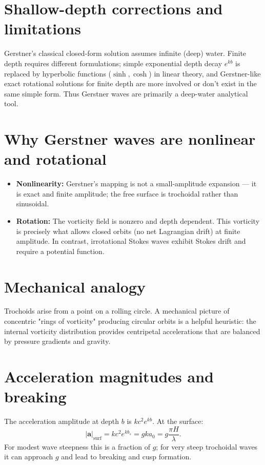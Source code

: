 \documentclass[11pt]{article}
\begin{document}
\section{Shallow-depth corrections and limitations}
Gerstner’s classical closed-form solution assumes infinite (deep) water. Finite depth requires different formulations; simple exponential depth decay $e^{kb}$ is replaced by hyperbolic functions ($\sinh, \cosh$) in linear theory, and Gerstner-like exact rotational solutions for finite depth are more involved or don't exist in the same simple form. Thus Gerstner waves are primarily a deep-water analytical tool.

\section{Why Gerstner waves are nonlinear and rotational}
\begin{itemize}
\item \textbf{Nonlinearity:} Gerstner’s mapping is not a small-amplitude expansion — it is exact and finite amplitude; the free surface is trochoidal rather than sinusoidal.
\item \textbf{Rotation:} The vorticity field is nonzero and depth dependent. This vorticity is precisely what allows closed orbits (no net Lagrangian drift) at finite amplitude. In contrast, irrotational Stokes waves exhibit Stokes drift and require a potential function.
\end{itemize}

\section{Mechanical analogy}
Trochoids arise from a point on a rolling circle. A mechanical picture of concentric "rings of vorticity" producing circular orbits is a helpful heuristic: the internal vorticity distribution provides centripetal accelerations that are balanced by pressure gradients and gravity.

\section{Acceleration magnitudes and breaking}
The acceleration amplitude at depth $b$ is $k c^2 e^{k b}$. At the surface:
\[
|\mathbf{a}|_{\mathrm{surf}} = k c^2 e^{k b_s} = g k a_0 = g\frac{\pi H}{\lambda}.
\]
For modest wave steepness this is a fraction of $g$; for very steep trochoidal waves it can approach $g$ and lead to breaking and cusp formation.
\end{document}
